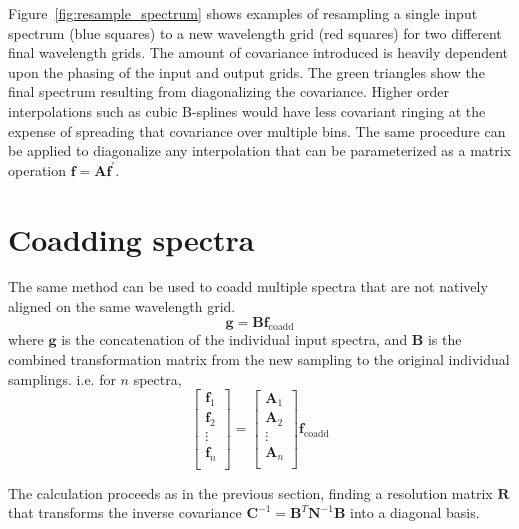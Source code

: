 \documentclass[12pt]{article}
\newcommand{\Ci}{\mathbf{C}^{-1}}
\newcommand{\R}{\mathbf{R}}
\newcommand{\A}{\mathbf{A}}
\newcommand{\N}{\mathbf{N}}
\newcommand{\f}{\mathbf{f}}
\begin{document}
Figure~\ref{fig:resample_spectrum} shows examples of resampling a single
input spectrum (blue squares) to a new wavelength grid (red squares)
for two different final wavelength grids.
The amount of covariance introduced is heavily dependent upon the
phasing of the input and output grids.  The green triangles show the
final spectrum resulting from diagonalizing the covariance.
Higher order interpolations such as cubic B-splines would have
less covariant ringing at the expense of spreading that covariance
over multiple bins.  The same procedure can be applied to diagonalize
any interpolation that can be parameterized as a matrix operation
$\f = \A \f^\prime$.

\section{Coadding spectra}
\label{sec:coadd}

The same method can be used to coadd multiple spectra that are not natively
aligned on the same wavelength grid.
\begin{equation}
    \mathbf{g} = \mathbf{B} \f_\mathrm{coadd}
\end{equation}
where $\mathbf{g}$ is the concatenation of the individual input spectra,
and $\mathbf{B}$
is the combined transformation matrix from the new sampling to the original
individual samplings.  i.e. for $n$ spectra,
\begin{equation}
    \left[ \begin{array}{c}
        \f_1 \\
        \f_2 \\
        \vdots \\
        \f_n \\
    \end{array}
    \right] = \left[ \begin{array}{c}
        \A_1 \\
        \A_2 \\
        \vdots \\
        \A_n \\
    \end{array}
    \right] \f_\mathrm{coadd}
\end{equation}

The calculation proceeds as in the previous section, finding a resolution
matrix $\R$ that transforms the inverse covariance
$\Ci = \mathbf{B}^T \N^{-1} \mathbf{B}$ into a diagonal basis.
\end{document}
